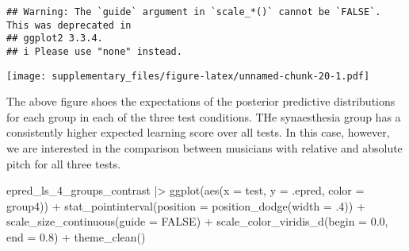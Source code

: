 \documentclass[
  man,floatsintext]{apa7}
\newenvironment{Shaded}{\begin{snugshade}}{\end{snugshade}}
\newcommand{\AttributeTok}[1]{\textcolor[rgb]{0.77,0.63,0.00}{#1}}
\newcommand{\ConstantTok}[1]{\textcolor[rgb]{0.00,0.00,0.00}{#1}}
\newcommand{\DecValTok}[1]{\textcolor[rgb]{0.00,0.00,0.81}{#1}}
\newcommand{\FloatTok}[1]{\textcolor[rgb]{0.00,0.00,0.81}{#1}}
\newcommand{\FunctionTok}[1]{\textcolor[rgb]{0.00,0.00,0.00}{#1}}
\newcommand{\NormalTok}[1]{#1}
\newcommand{\OtherTok}[1]{\textcolor[rgb]{0.56,0.35,0.01}{#1}}
\newcommand{\SpecialCharTok}[1]{\textcolor[rgb]{0.00,0.00,0.00}{#1}}
\newcommand{\StringTok}[1]{\textcolor[rgb]{0.31,0.60,0.02}{#1}}
\begin{document}
\begin{verbatim}
## Warning: The `guide` argument in `scale_*()` cannot be `FALSE`. This was deprecated in
## ggplot2 3.3.4.
## i Please use "none" instead.
\end{verbatim}

\texttt{[image: supplementary\_files/figure-latex/unnamed-chunk-20-1.pdf]}

The above figure shoes the expectations of the posterior predictive distributions for each group in each of the three test conditions. THe synaesthesia group has a consistently higher expected learning score over all tests. In this case, however, we are interested in the comparison between musicians with relative and absolute pitch for all three tests.

\begin{Shaded}
\end{Shaded}

\begin{Shaded}
\begin{Highlighting}[]
\NormalTok{epred\_ls\_4\_groups\_contrast }\SpecialCharTok{|\textgreater{}} 
    \FunctionTok{ggplot}\NormalTok{(}\FunctionTok{aes}\NormalTok{(}\AttributeTok{x =}\NormalTok{ test, }\AttributeTok{y =}\NormalTok{ .epred, }\AttributeTok{color =}\NormalTok{ group4)) }\SpecialCharTok{+}
  \FunctionTok{stat\_pointinterval}\NormalTok{(}\AttributeTok{position =} \FunctionTok{position\_dodge}\NormalTok{(}\AttributeTok{width =}\NormalTok{ .}\DecValTok{4}\NormalTok{)) }\SpecialCharTok{+}
  \FunctionTok{scale\_size\_continuous}\NormalTok{(}\AttributeTok{guide =} \ConstantTok{FALSE}\NormalTok{) }\SpecialCharTok{+}
  \FunctionTok{scale\_color\_viridis\_d}\NormalTok{(}\AttributeTok{begin =} \FloatTok{0.0}\NormalTok{, }\AttributeTok{end =} \FloatTok{0.8}\NormalTok{) }\SpecialCharTok{+}
  \FunctionTok{theme\_clean}\NormalTok{()}
\end{Highlighting}
\end{Shaded}
\end{document}
